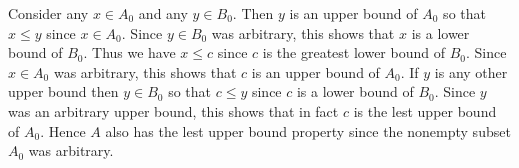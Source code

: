 {{    Consider any $x \in A_0$ and any $y \in B_0$.
    Then $y$ is an upper bound of $A_0$ so that $x \leq y$ since $x \in A_0$.
    Since $y \in B_0$ was arbitrary, this shows that $x$ is a lower bound of $B_0$.
    Thus we have $x \leq c$ since $c$ is the greatest lower bound of $B_0$.
    Since $x \in A_0$ was arbitrary, this shows that $c$ is an upper bound of $A_0$.
    If $y$ is any other upper bound then $y \in B_0$ so that $c \leq y$ since $c$ is a lower bound of $B_0$.
    Since $y$ was an arbitrary upper bound, this shows that in fact $c$ is the lest upper bound of $A_0$.
    Hence $A$ also has the lest upper bound property since the nonempty subset $A_0$ was arbitrary.
  }
}

\renewcommand\ppt[1]{x_{#1} \times y_{#1}}
